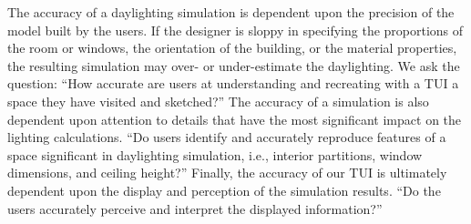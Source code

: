 \documentclass{article}
\begin{document}
The accuracy of a daylighting simulation is dependent upon the
precision of the model built by the users.  If the designer is sloppy
in specifying the proportions of the room or windows, the orientation
of the building, or the material properties, the resulting simulation
may over- or under-estimate the daylighting.  We ask the question:
``How accurate are users at understanding and recreating with a TUI a
space they have visited and sketched?''
%
The accuracy of a simulation is also dependent upon attention to
details that have the most significant impact on the lighting
calculations.  ``Do users identify and accurately reproduce features
of a space significant in daylighting simulation, i.e., interior
partitions, window dimensions, and ceiling height?''
%
Finally, the accuracy of our TUI is ultimately dependent upon the
display and perception of the simulation results.  ``Do the users
accurately perceive and interpret the displayed information?''  
\end{document}
